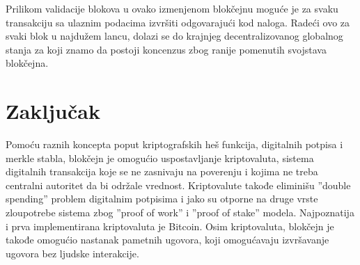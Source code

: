 \documentclass[a4paper]{article}
\begin{document}
Prilikom validacije blokova u ovako izmenjenom blokčejnu moguće je za svaku transakciju sa ulaznim podacima izvršiti odgovarajući kod naloga. Radeći ovo za svaki blok u najdužem lancu, dolazi se do krajnjeg decentralizovanog globalnog stanja za koji znamo da postoji koncenzus zbog ranije pomenutih svojstava blokčejna.



\section{Zaključak}
\label{sec:zakljucak}
Pomoću raznih koncepta poput kriptografskih heš funkcija, digitalnih potpisa i merkle stabla, blokčejn je omogućio uspostavljanje kriptovaluta, sistema digitalnih transakcija koje se ne zasnivaju na poverenju i kojima ne treba centralni autoritet da bi održale vrednost. Kriptovalute takođe eliminišu ''double spending'' problem digitalnim potpisima i jako su otporne na druge vrste zloupotrebe sistema zbog ''proof of work'' i ''proof of stake'' modela. Najpoznatija i prva implementirana kriptovaluta je Bitcoin. Osim kriptovaluta, blokčejn je takođe omogućio nastanak pametnih ugovora, koji omogućavaju izvršavanje ugovora bez ljudske interakcije.

\appendix


 

\end{document}
